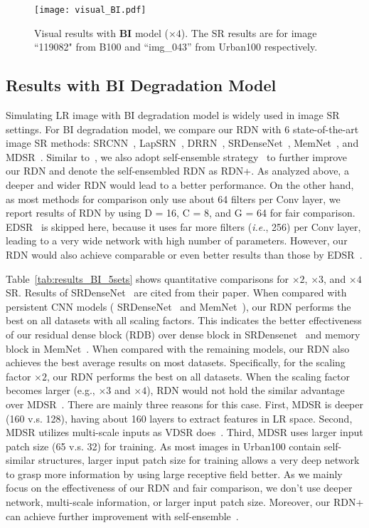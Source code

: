 \documentclass[10pt,twocolumn,letterpaper]{article}
\begin{document}
\begin{figure*}[htbp]
\centering
\texttt{[image: visual\_BI.pdf]}
\caption{Visual results with \textbf{BI} model ($\times4$). The SR results are for image ``119082" from B100 and ``img\_043'' from Urban100 respectively.}
\label{fig:visual_BI}  
\vspace{-5mm}
\end{figure*}
\subsection{Results with BI Degradation Model}
\label{subsec:BI-degradation}
Simulating LR image with BI degradation model is widely used in image SR settings. For BI degradation model, we compare our RDN with 6 state-of-the-art image SR methods: SRCNN~\cite{dong2016image}, LapSRN~\cite{lai2017deep}, DRRN~\cite{tai2017image}, SRDenseNet~\cite{tong2017image}, MemNet~\cite{tai2017memnet}, and MDSR~\cite{lim2017enhanced}. Similar to~\cite{timofte2016seven,lim2017enhanced}, we also adopt self-ensemble strategy~\cite{lim2017enhanced} to further improve our RDN and denote the self-ensembled RDN as RDN+. As analyzed above, a deeper and wider RDN would lead to a better performance. On the other hand, as most methods for comparison only use about 64 filters per Conv layer, we report results of RDN by using D = 16, C = 8, and G = 64 for fair comparison. EDSR~\cite{lim2017enhanced} is skipped here, because it uses far more filters (\textit{i.e.}, 256) per Conv layer, leading to a very wide network with high number of parameters. However, our RDN would also achieve comparable or even better results than those by EDSR~\cite{lim2017enhanced}.

Table~\ref{tab:results_BI_5sets} shows quantitative comparisons for $\times2$, $\times3$, and $\times4$ SR. Results of SRDenseNet~\cite{tong2017image} are cited from their paper. When compared with persistent CNN models ( SRDenseNet~\cite{tong2017image} and MemNet~\cite{tai2017memnet}), our RDN performs the best on all datasets with all scaling factors. This indicates the better effectiveness of our residual dense block (RDB) over dense block in SRDensenet~\cite{tong2017image} and memory block in MemNet~\cite{tai2017memnet}. When compared with the remaining models, our RDN also achieves the best average results on most datasets. Specifically, for the scaling factor $\times2$, our RDN performs the best on all datasets. When the scaling factor becomes larger (e.g., $\times3$ and $\times4$), RDN would not hold the similar advantage over MDSR~\cite{lim2017enhanced}. There are mainly three reasons for this case. First, MDSR is deeper (160 v.s. 128), having about 160 layers to extract features in LR space. Second, MDSR utilizes multi-scale inputs as VDSR does~\cite{kim2016accurate}. Third, MDSR uses larger input patch size (65 v.s. 32) for training. As most images in Urban100 contain self-similar structures, larger input patch size for training allows a very deep network to grasp more information by using large receptive field better. As we mainly focus on the effectiveness of our RDN and fair comparison, we don't use deeper network, multi-scale information, or larger input patch size. Moreover, our RDN+ can achieve further improvement with self-ensemble~\cite{lim2017enhanced}.
\end{document}
